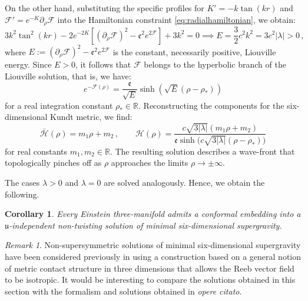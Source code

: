 \documentclass[10pt,a4paper,twoside,reqno]{amsart}
\theoremstyle{plain}
\newtheorem{cor}[thm]{Corollary}
\theoremstyle{definition}
\theoremstyle{remark}
\newtheorem{remark}[thm]{Remark}
\def\cH{\mathcal{H}}
\def\cF{\mathcal{F}}
\def\cH{\mathcal{H}}
\def\fru{\mathfrak{u}}
\begin{document}
\noindent
On the other hand, substituting the specific profiles for $K' = -k \tan(kr)$ and $\mathcal{F}' = e^{-K} \partial_{\rho}\mathcal{F}$ into the Hamiltonian constraint \eqref{eq:radialhamiltonian}, we obtain:
\begin{equation*}
3k^2 \tan^2(kr) - 2 e^{-2K} \left[ (\partial_\rho\mathcal{F})^2 - \mathfrak{e}^2 e^{2\mathcal{F}} \right] + 3k^2 = 0 \implies E = \frac{3}{2} c^2 k^2 = 3 c^2 |\lambda| > 0 \, ,
\end{equation*}
where $E := (\partial_\rho\mathcal{F})^2 - \mathfrak{e}^2 e^{2\mathcal{F}}$ is the constant, necessarily positive, Liouville energy. Since $E > 0$, it follows that $\cF$ belongs to the hyperbolic branch of the Liouville solution, that is, we have:
\begin{equation*}
e^{-\mathcal{F}(\rho)} = \frac{\mathfrak{e}}{\sqrt{E}} \sinh(\sqrt{E}(\rho - \rho_*))
\end{equation*}
for a real integration constant $\rho_*\in \mathbb{R}$. Reconstructing the components for the six-dimensional Kundt metric, we find:
\begin{equation*}
\bar{\cH}(\rho) = m_1 \rho + m_2 \, , \qquad \cH(\rho) = \frac{c\sqrt{3|\lambda|}\left( m_1 \rho + m_2 \right)}{\mathfrak{e} \sinh \big( c \sqrt{3|\lambda|} (\rho - \rho_*)\big)}
\end{equation*}
for real constants $m_1 , m_2 \in \mathbb{R}$. The resulting solution describes a wave-front that topologically pinches off as $\rho$ approaches the limits $\rho \to \pm \infty$.\medskip

The cases $\lambda > 0$ and $\lambda = 0$ are solved analogously. Hence, we obtain the following.

\begin{cor}
Every Einstein three-manifold admits a conformal embedding into a $\fru$-independent non-twisting solution of minimal six-dimensional supergravity.
\end{cor}

\begin{remark}
Non-supersymmetric solutions of minimal six-dimensional supergravity have been considered previously in \cite{Murcia:2019cck} using a construction based on a general notion of metric contact structure in three dimensions that allows the Reeb vector field to be isotropic. It would be interesting to compare the solutions obtained in this section with the formalism and solutions obtained in \emph{opere citato}.
\end{remark}

\end{document}
